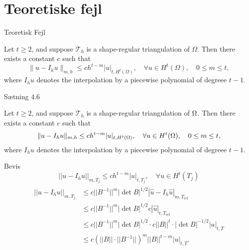 \section{Teoretiske fejl}
\begin{frame}{Teoretisk Fejl}
\begin{theorem}
    Let $t \geq 2$, and suppose $\mathcal{T}_h$ is a shape-regular triangulation of $\Omega$. Then there exists a constant $c$ such that
    \begin{equation*}
        \|u - I_h u\|_{m,h} \leq c h^{t-m} |u|_{t, H^t(\Omega)}, \quad \forall u \in H^t(\Omega), \quad 0 \leq m \leq t,
    \end{equation*}
    where $I_h u$ denotes the interpolation by a piecewise polynomial of degreee $t-1$.
\end{theorem}
\end{frame}
\iffalse
\begin{frame}{Sætning 4.6}{}
    \begin{theorem}
    Let $t \geq 2$, and suppose $\mathcal{T}_h$ is a shape-regular triangulation of $\Omega$. Then there exists a constant $c$ such that
    \begin{equation}
        \|u - I_h u\| _{m,h} \leq c h^{t-m} |u|_{t, H^t(\Omega)}, \quad \forall u \in H^t(\Omega), \quad 0 \leq m \leq t,
    \end{equation}
    where $I_h u$ denotes the interpolation by a piecewise polynomial of degreee $t-1$.
    \end{theorem}
\end{frame}
\begin{frame}{Bevis}
    \begin{equation}
        ||u-I_h u||_{m,T_j} \leq c h^{t-m} |u|_{t,T_j}, \quad \forall u \in H^t(T_j)
    \end{equation}
    \begin{align}
        \begin{split}
        ||u-I_h u||_{m,T_j} &\leq c ||B^{-1}||^m |\det B |^{1/2} |\hat{u} - I_h \hat{u}|_{m,T_{\text{ref}}} \\
                            &\leq c ||B^{-1}||^m |\det B |^{1/2} c | \hat{u} |_{t,T_{\text{ref}}} \\
                            &\leq c ||B^{-1}||^m |\det B |^{1/2} \cdot c ||B||^t \cdot |\det B |^{-1/2} |u|_{t,T}  \\
                         &\leq c {\left( ||B||  \cdot ||B^{-1}|| \right)}^m ||B||^{t-m} |u|_{t,T}.
        \end{split}
    \end{align}
\end{frame}
